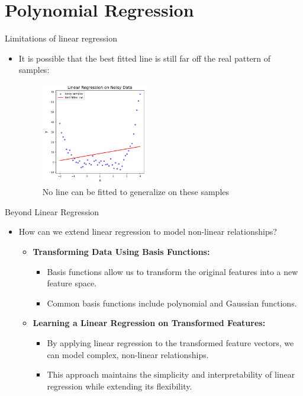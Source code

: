 \documentclass[serif, aspectratio=169]{beamer}
\begin{document}
\section{Polynomial Regression}

\begin{frame}{Limitations of linear regression}
    \begin{itemize}
        \item It is possible that the best fitted line is still far off the real pattern of samples:
        \begin{figure}[h]
            \centering
            \includegraphics[width=0.45\textwidth]{pic/Polynomial_regression/best_fitted_line.png}
            \caption{No line can be fitted to generalize on these samples}
        \end{figure}
    \end{itemize}
\end{frame}


\begin{frame}{Beyond Linear Regression}
    \begin{itemize}
        \item How can we extend linear regression to model non-linear relationships?
        \begin{itemize}
            \item \textbf{Transforming Data Using Basis Functions:}
            \begin{itemize}
                \item Basis functions allow us to transform the original features into a new feature space.
                \item Common basis functions include polynomial and Gaussian functions.
            \end{itemize}
            \item \textbf{Learning a Linear Regression on Transformed Features:}
            \begin{itemize}
                \item By applying linear regression to the transformed feature vectors, we can model complex, non-linear relationships.
                \item This approach maintains the simplicity and interpretability of linear regression while extending its flexibility.
            \end{itemize}
        \end{itemize}
    \end{itemize}
\end{frame}
\end{document}
